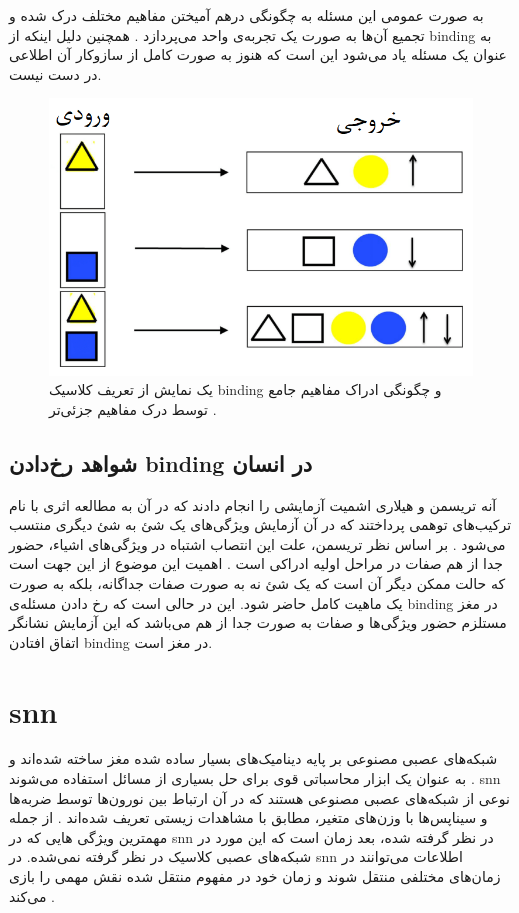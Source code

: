 \documentclass[12pt]{report}
\begin{document}
	به صورت عمومی این مسئله به چگونگی در‌هم آمیختن مفاهیم مختلف درک شده و تجمیع آن‌ها به صورت یک تجربه‌ی واحد می‌پردازد
	\cite{Feldman2012}.
	همچنین دلیل اینکه از \gls{binding} به عنوان یک مسئله یاد می‌شود این است که هنوز به صورت کامل از سازوکار آن اطلاعی در دست نیست.
	
	\begin{figure}[H]
		\centering
		\includegraphics[width=0.7\linewidth]{binding.png}
		\caption[NS]{
			یک نمایش از تعریف کلاسیک \gls{binding} و چگونگی ادراک مفاهیم جامع توسط درک مفاهیم جزئی‌تر
			\cite{velic2012}.
		}
		\label{fig:binding}
	\end{figure}
	
	
	\subsection{شواهد رخ‌دادن \gls{binding} در انسان}
	
	آنه تریسمن
	و هیلاری اشمیت
	آزمایشی را انجام دادند که در آن به مطالعه اثری با نام ترکیب‌های توهمی
	پرداختند که در آن آزمایش ویژگی‌های یک شئ به شئ دیگری منتسب می‌شود
	\cite{TREISMAN1982107}.
	بر اساس نظر تریسمن، علت این انتصاب اشتباه در ویژگی‌های اشیاء، حضور جدا از هم صفات در مراحل اولیه ادراکی است
	\cite{goldstein_2019}.
	اهمیت این موضوع از این جهت است که حالت ممکن دیگر آن است که یک شئ نه به صورت صفات جداگانه، بلکه به صورت یک ماهیت کامل حاضر شود. این در حالی است که رخ دادن مسئله‌ی \gls{binding} در مغز مستلزم حضور ویژگی‌ها و صفات به صورت جدا از هم می‌باشد که این آزمایش نشانگر اتفاق افتادن \gls{binding} در مغز است.
	
	
	\section{\gls{snn}}
	شبکه‌های عصبی مصنوعی بر پایه دینامیک‌های بسیار ساده شده مغز ساخته شده‌اند و به عنوان یک ابزار محاسباتی قوی برای حل بسیاری از مسائل استفاده می‌شوند
	\cite{TGNN}. 
	\gls{snn} نوعی از شبکه‌های عصبی مصنوعی هستند که در آن ارتباط بین نورون‌ها توسط ضربه‌ها و سیناپس‌ها  با وزن‌های متغیر، مطابق با مشاهدات زیستی تعریف شده‌اند
	\cite{ghosh2009spiking}. 
	از جمله مهمترین ویژگی هایی که در \gls{snn} در نظر گرفته شده، بعد زمان است
	\cite{Mozafari2019}
	که این مورد در شبکه‌های عصبی کلاسیک در نظر گرفته نمی‌شده. در \gls{snn} اطلاعات می‌توانند در زمان‌های مختلفی منتقل شوند و زمان خود در مفهوم منتقل شده نقش مهمی را بازی می‌کند
	\cite{SNN1997}.
	
\end{document}
